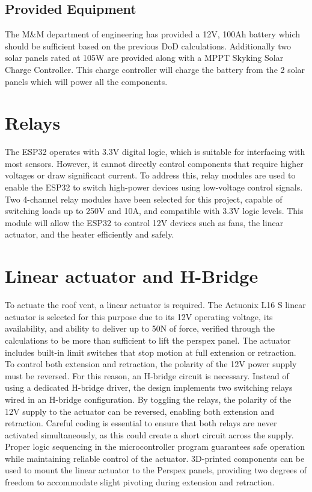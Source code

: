 \subsection{Provided Equipment}\label{sec:provided}

The M\&M department of engineering has provided a 12V, 100Ah battery which should be sufficient based on the previous DoD calculations. Additionally two solar panels rated at 105W are provided along with a MPPT Skyking Solar Charge Controller. This charge controller will charge the battery from the 2 solar panels which will power all the components. 

\section{Relays}
The ESP32 operates with 3.3V digital logic, which is suitable for interfacing with most sensors. However, it cannot directly control components that require higher voltages or draw significant current. To address this, relay modules are used to enable the ESP32 to switch high-power devices using low-voltage control signals. Two 4-channel relay modules have been selected for this project, capable of switching loads up to 250V and 10A, and compatible with 3.3V logic levels. This module will allow the ESP32 to control 12V devices such as fans, the linear actuator, and the heater efficiently and safely. 

\section{Linear actuator and H-Bridge}

To actuate the roof vent, a linear actuator is required. The Actuonix L16 S linear actuator is selected for this purpose due to its 12V operating voltage, its availability, and ability to deliver up to 50N of force, verified through the calculations to be more than sufficient to lift the perspex panel. The actuator includes built-in limit switches that stop motion at full extension or retraction. To control both extension and retraction, the polarity of the 12V power supply must be reversed. For this reason, an H-bridge circuit is necessary. Instead of using a dedicated H-bridge driver, the design implements two switching relays wired in an H-bridge configuration.  By toggling the relays, the polarity of the 12V supply to the actuator can be reversed, enabling both extension and retraction. Careful coding is essential to ensure that both relays are never activated simultaneously, as this could create a short circuit across the supply. Proper logic sequencing in the microcontroller program guarantees safe operation while maintaining reliable control of the actuator. 3D-printed components can be used to mount the linear actuator to the Perspex panels, providing two degrees of freedom to accommodate slight pivoting during extension and retraction.

